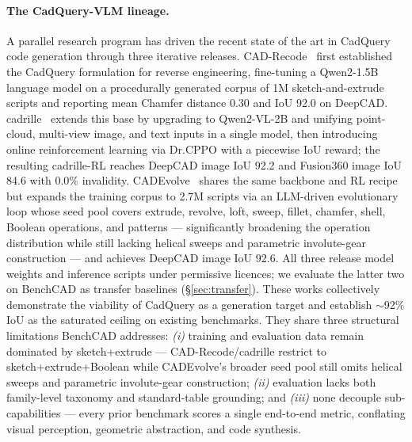 \documentclass{article}
\begin{document}
\paragraph{The CadQuery-VLM lineage.}
A parallel research program has driven the recent state of the art in CadQuery code generation through three iterative releases. CAD-Recode~\citep{Rukhovich2025} first established the CadQuery formulation for reverse engineering, fine-tuning a Qwen2-1.5B language model on a procedurally generated corpus of 1M sketch-and-extrude scripts and reporting mean Chamfer distance 0.30 and IoU 92.0 on DeepCAD. cadrille~\citep{Kolodiazhnyi2026} extends this base by upgrading to Qwen2-VL-2B and unifying point-cloud, multi-view image, and text inputs in a single model, then introducing online reinforcement learning via Dr.CPPO with a piecewise IoU reward; the resulting cadrille-RL reaches DeepCAD image IoU 92.2 and Fusion360 image IoU 84.6 with 0.0\% invalidity. CADEvolve~\citep{Elistratov2026} shares the same backbone and RL recipe but expands the training corpus to 2.7M scripts via an LLM-driven evolutionary loop whose seed pool covers extrude, revolve, loft, sweep, fillet, chamfer, shell, Boolean operations, and patterns --- significantly broadening the operation distribution while still lacking helical sweeps and parametric involute-gear construction --- and achieves DeepCAD image IoU 92.6. All three release model weights and inference scripts under permissive licences; we evaluate the latter two on BenchCAD as transfer baselines (\S\ref{sec:transfer}). These works collectively demonstrate the viability of CadQuery as a generation target and establish $\sim$92\% IoU as the saturated ceiling on existing benchmarks. They share three structural limitations BenchCAD addresses: \textit{(i)} training and evaluation data remain dominated by sketch+extrude --- CAD-Recode/cadrille restrict to sketch+extrude+Boolean while CADEvolve's broader seed pool still omits helical sweeps and parametric involute-gear construction; \textit{(ii)} evaluation lacks both family-level taxonomy and standard-table grounding; and \textit{(iii)} none decouple sub-capabilities --- every prior benchmark scores a single end-to-end metric, conflating visual perception, geometric abstraction, and code synthesis.
\end{document}
